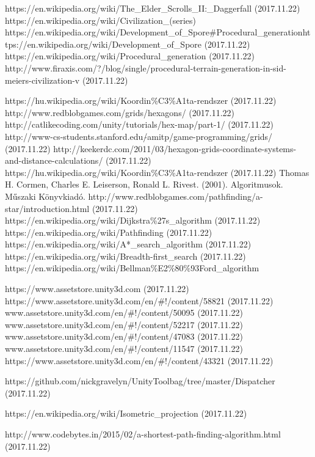 \begin{thebibliography}{x}

 https://en.wikipedia.org/wiki/The\_Elder\_Scrolls\_II:\_Daggerfall (2017.11.22)
 https://en.wikipedia.org/wiki/Civilization\_(series)
 https://en.wikipedia.org/wiki/Development\_of\_Spore\#Procedural\_generationhttps://en.wikipedia.org/wiki/Development\_of\_Spore (2017.11.22)
 https://en.wikipedia.org/wiki/Procedural\_generation (2017.11.22)
 http://www.firaxis.com/?/blog/single/procedural-terrain-generation-in-sid-meiers-civilization-v (2017.11.22)

 https://hu.wikipedia.org/wiki/Koordin\%C3\%A1ta-rendszer (2017.11.22)
 http://www.redblobgames.com/grids/hexagons/ (2017.11.22)
 http://catlikecoding.com/unity/tutorials/hex-map/part-1/ (2017.11.22)
 http://www-cs-students.stanford.edu/$\tilde{}$amitp/game-programming/grids/ (2017.11.22)
 http://keekerdc.com/2011/03/hexagon-grids-coordinate-systems-and-distance-calculations/ (2017.11.22)
 https://hu.wikipedia.org/wiki/Koordin\%C3\%A1ta-rendszer (2017.11.22)
 Thomas H. Cormen, Charles E. Leiserson, Ronald L. Rivest. (2001). Algoritmusok. Műszaki Könyvkiadó.
 http://www.redblobgames.com/pathfinding/a-star/introduction.html (2017.11.22)
 https://en.wikipedia.org/wiki/Dijkstra\%27s\_algorithm (2017.11.22)
 https://en.wikipedia.org/wiki/Pathfinding (2017.11.22)
 https://en.wikipedia.org/wiki/A*\_search\_algorithm (2017.11.22)
 https://en.wikipedia.org/wiki/Breadth-first\_search (2017.11.22)
 https://en.wikipedia.org/wiki/Bellman\%E2\%80\%93Ford\_algorithm

 https://www.assetstore.unity3d.com (2017.11.22)
 https://www.assetstore.unity3d.com/en/\#!/content/58821 (2017.11.22)
 www.assetstore.unity3d.com/en/\#!/content/50095 (2017.11.22)
 www.assetstore.unity3d.com/en/\#!/content/52217 (2017.11.22)
 www.assetstore.unity3d.com/en/\#!/content/47083 (2017.11.22)
 www.assetstore.unity3d.com/en/\#!/content/11547 (2017.11.22)
 https://www.assetstore.unity3d.com/en/\#!/content/43321 (2017.11.22)

 https://github.com/nickgravelyn/UnityToolbag/tree/master/Dispatcher (2017.11.22)

 https://en.wikipedia.org/wiki/Isometric\_projection (2017.11.22)

 http://www.codebytes.in/2015/02/a-shortest-path-finding-algorithm.html (2017.11.22)



\end{thebibliography}
